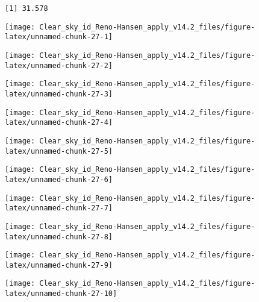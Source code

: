 \documentclass[
  10pt,
  a4paper,oneside]{article}
\begin{document}
\begin{verbatim}
[1] 31.578
\end{verbatim}

\begin{center}\texttt{[image: Clear\_sky\_id\_Reno-Hansen\_apply\_v14.2\_files/figure-latex/unnamed-chunk-27-1]} \end{center}

\begin{center}\texttt{[image: Clear\_sky\_id\_Reno-Hansen\_apply\_v14.2\_files/figure-latex/unnamed-chunk-27-2]} \end{center}

\begin{center}\texttt{[image: Clear\_sky\_id\_Reno-Hansen\_apply\_v14.2\_files/figure-latex/unnamed-chunk-27-3]} \end{center}

\begin{center}\texttt{[image: Clear\_sky\_id\_Reno-Hansen\_apply\_v14.2\_files/figure-latex/unnamed-chunk-27-4]} \end{center}

\begin{center}\texttt{[image: Clear\_sky\_id\_Reno-Hansen\_apply\_v14.2\_files/figure-latex/unnamed-chunk-27-5]} \end{center}

\begin{center}\texttt{[image: Clear\_sky\_id\_Reno-Hansen\_apply\_v14.2\_files/figure-latex/unnamed-chunk-27-6]} \end{center}

\begin{center}\texttt{[image: Clear\_sky\_id\_Reno-Hansen\_apply\_v14.2\_files/figure-latex/unnamed-chunk-27-7]} \end{center}

\begin{center}\texttt{[image: Clear\_sky\_id\_Reno-Hansen\_apply\_v14.2\_files/figure-latex/unnamed-chunk-27-8]} \end{center}

\begin{center}\texttt{[image: Clear\_sky\_id\_Reno-Hansen\_apply\_v14.2\_files/figure-latex/unnamed-chunk-27-9]} \end{center}

\begin{center}\texttt{[image: Clear\_sky\_id\_Reno-Hansen\_apply\_v14.2\_files/figure-latex/unnamed-chunk-27-10]} \end{center}
\end{document}
